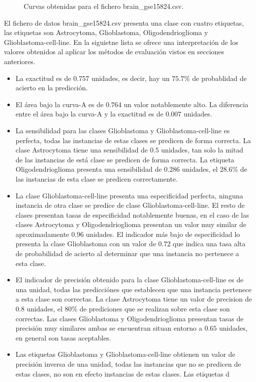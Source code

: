 \bigbreak

\begin{figure}[htp]
    \centering
    \caption{Curvas obtenidas para el fichero brain\_gse15824.csv.}
    \label{fig:10}
\end{figure}

\bigbreak

El fichero de datos brain\_gse15824.csv presenta una clase con cuatro etiquetas, las etiquetas son Astrocytoma, Glioblastoma, Oligodendrioglioma y Glioblastoma-cell-line. En la siguietne lista se ofrece una interpretación de los valores obtenidos al aplicar los métodos de evaluación vistos en secciones anteriores.

\bigbreak

\begin{itemize}
    \item La exactitud es de 0.757 unidades, es decir, hay un $75.7$\% de probablidad de acierto en la predicción.
    \item El área bajo la curva-A es de $0.764$ un valor notablemente alto. La diferencia entre el área bajo la curva-A y la exactitud es de $0.007$ unidades.
    \item La sensibilidad para las clases Glioblastoma y Glioblastoma-cell-line es perfecta, todas las instancias de estas clases se predicen de forma correcta. La clase Astrocytoma tiene una sensibilidad de $0.5$ unidades, tan solo la mitad de las instancias de está clase se predicen de forma correcta. La etiqueta Oligodendrioglioma presenta una sensibilidad de $0.286$ unidades, el $28.6$\% de las instancias de esta clase se predicen correctamente.
    \item La clase Glioblastoma-cell-line presenta una especificidad perfecta, ninguna instancia de otra clase se predice de clase Glioblastoma-cell-line. El resto de clases presentan tasas de especificidad notablemente buenas, en el caso de las clases Astrocytoma y Oligodendrioglioma presentan un valor muy similar de aproximadamente $0.96$ unidades. El indicador más bajo de especificidad lo presenta la clase Glioblastoma con un valor de $0.72$ que indica una tasa alta de probabilidad de acierto al determinar que una instancia no pertenece a esta clase.
    \item El indicador de precisión obtenido para la clase Glioblastoma-cell-line es de una unidad, todas las predicciónes que establecen que una instancia pertenece a esta clase son correctas. La clase Astrocytoma tiene un valor de precision de $0.8$ unidades, el 80\% de prediciones que se realizan sobre esta clase son correctas. Las clases Glioblastoma y Oligodendrioglioma presentan tasas de precisión muy similares ambas se encuentran situan entorno a $0.65$ unidades, en general son tasas aceptables.
    \item Las etiquetas Glioblastoma y Glioblastoma-cell-line obtienen un valor de precisión inversa de una unidad, todas las instancias que no se predicen de estas clases, no son en efecto instancias de estas clases. Las etiquetas d
\end{itemize}

